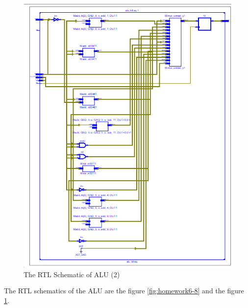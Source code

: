 \documentclass{article}
\begin{document}
    \begin{figure}
      \centering
      \includegraphics[width=1\linewidth]{homework6-7}
      \caption{The RTL Schematic of ALU (2)}
      \label{fig:homework6-7}
    \end{figure}
    

    The RTL schematics of the ALU are the figure \ref{fig:homework6-8} and the figure \ref{fig:homework6-7}.
    
   
\end{document}
